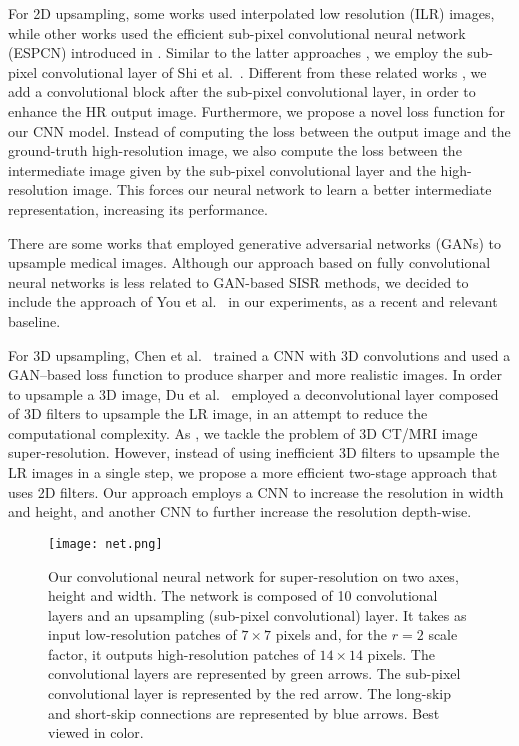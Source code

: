 \documentclass{ieeeaccess}
\begin{document}
For 2D upsampling, some works \cite{Sert-MH-2019, Du-NC-2019, Jurek-BBE-2019, Shi-JBHI-2018} used interpolated low resolution (ILR) images, while other works \cite{Du-AS-2019, Hatvani-TRPMS-2018, Yu-ICIP-2017, Zhao-TMI-2019} used the efficient sub-pixel convolutional neural network (ESPCN) introduced in \cite{Shi-CVPR-2016}. Similar to the latter approaches \cite{Du-AS-2019, Hatvani-TRPMS-2018, Yu-ICIP-2017, Zhao-TMI-2019}, we employ the sub-pixel convolutional layer of Shi et al.~\cite{Shi-CVPR-2016}. Different from these related works \cite{Du-AS-2019, Hatvani-TRPMS-2018, Yu-ICIP-2017, Zhao-TMI-2019}, we add a convolutional block after the sub-pixel convolutional layer, in order to enhance the HR output image. Furthermore, we propose a novel loss function for our CNN model. Instead of computing the loss between the output image and the ground-truth high-resolution image, we also compute the loss between the intermediate image given by the sub-pixel convolutional layer and the high-resolution image. This forces our neural network to learn a better intermediate representation, increasing its performance. 

There are some works \cite{Chen-MICCAI-2018, Mahapatra-CMIG-2019, You-TMI-2019} that employed generative adversarial networks (GANs) \cite{Goodfellow-NIPS-2014} to upsample medical images. Although our approach based on fully convolutional neural networks is less related to GAN-based SISR methods, we decided to include the approach of You et al.~\cite{You-TMI-2019} in our experiments, as a recent and relevant baseline.

For 3D upsampling, Chen et al.~\cite{Chen-MICCAI-2018} trained a CNN with 3D convolutions and used a GAN--based loss function to produce sharper and more realistic images. In order to upsample a 3D image, Du et al.~\cite{Du-BIBM-2018} employed a deconvolutional layer composed of 3D filters to upsample the LR image, in an attempt to reduce the computational complexity. As \cite{Chen-MICCAI-2018, Du-BIBM-2018, Huang-CVPR-2017, Oktay-MICCAI-2016}, we tackle the problem of 3D CT/MRI image super-resolution. However, instead of using inefficient 3D filters to upsample the LR images in a single step, we propose a more efficient two-stage approach that uses 2D filters. Our approach employs a CNN to increase the resolution in width and height, and another CNN to further increase the resolution depth-wise.

\begin{figure*}[t!]
\centering
\texttt{[image: net.png]}
\caption{Our convolutional neural network for super-resolution on two axes, height and width. The network is composed of 10 convolutional layers and an upsampling (sub-pixel convolutional) layer. It takes as input low-resolution patches of $7 \times 7$ pixels and, for the $r=2$ scale factor, it outputs high-resolution patches of $14 \times 14$ pixels. The convolutional layers are represented by green arrows. The sub-pixel convolutional layer is represented by the red arrow. The long-skip and short-skip connections are represented by blue arrows. Best viewed in color.}
\label{fig_architecture}
\end{figure*}
\end{document}
